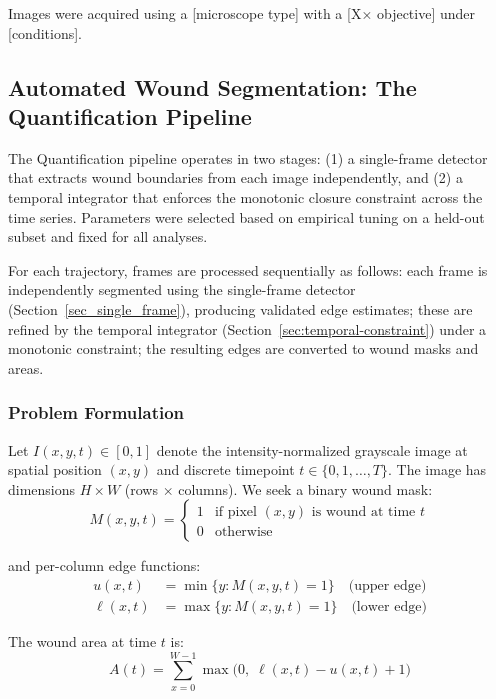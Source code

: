 Images were acquired using a [microscope type] with a [X× objective] under [conditions].

\subsection{Automated Wound Segmentation: The Quantification Pipeline}

The Quantification pipeline operates in two stages: (1) a single-frame detector that extracts wound boundaries from each image independently, and (2) a temporal integrator that enforces the monotonic closure constraint across the time series. Parameters were selected based on empirical tuning on a held-out subset and fixed for all analyses.

For each trajectory, frames are processed sequentially as follows: each frame is independently segmented using the single-frame detector (Section~\ref{sec_single_frame}), producing validated edge estimates; these are refined by the temporal integrator (Section~\ref{sec:temporal-constraint}) under a monotonic constraint; the resulting edges are converted to wound masks and areas.

\subsubsection{Problem Formulation}

Let $I(x, y, t) \in [0, 1]$ denote the intensity-normalized grayscale image at spatial
position $(x, y)$ and discrete timepoint $t \in \{0, 1, \ldots, T\}$. The image has dimensions $H \times W$ (rows $\times$ columns).
We seek a binary wound mask:
\begin{equation}
  M(x, y, t) = \begin{cases}
    1 & \text{if pixel $(x, y)$ is wound at time $t$} \\
    0 & \text{otherwise}
  \end{cases}
  \label{eq:mask}
\end{equation}

and per-column edge functions:
\begin{align}
  u(x, t) &= \min\{y : M(x, y, t) = 1\} \quad \text{(upper edge)} \label{eq:upper-edge} \\
  \ell(x, t) &= \max\{y : M(x, y, t) = 1\} \quad \text{(lower edge)} \label{eq:lower-edge}
\end{align}

The wound area at time $t$ is:
\begin{equation}
  A(t) = \sum_{x=0}^{W-1} \max\!\bigl(0,\; \ell(x,t) - u(x,t) + 1\bigr)
  \label{eq:area}
\end{equation}

